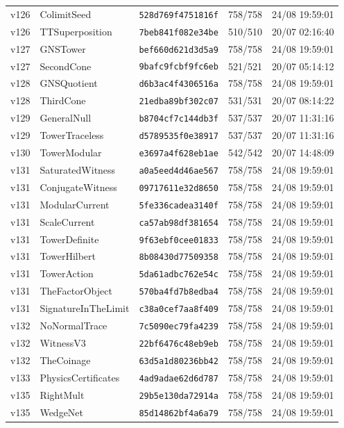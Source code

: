 \documentclass[11pt]{article}
\theoremstyle{definition}\newtheorem{deriv}{Derivation}
\begin{document}
{\begin{longtable}{@{}lllll@{}}
v126 & ColimitSeed & \texttt{528d769f4751816f} & 758/758 & 24/08 19:59:01 \\
v126 & TTSuperposition & \texttt{7beb841f082e34be} & 510/510 & 20/07 02:16:40 \\
v127 & GNSTower & \texttt{bef660d621d3d5a9} & 758/758 & 24/08 19:59:01 \\
v127 & SecondCone & \texttt{9bafc9fcbf9fc6eb} & 521/521 & 20/07 05:14:12 \\
v128 & GNSQuotient & \texttt{d6b3ac4f4306516a} & 758/758 & 24/08 19:59:01 \\
v128 & ThirdCone & \texttt{21edba89bf302c07} & 531/531 & 20/07 08:14:22 \\
v129 & GeneralNull & \texttt{b8704cf7c144db3f} & 537/537 & 20/07 11:31:16 \\
v129 & TowerTraceless & \texttt{d5789535f0e38917} & 537/537 & 20/07 11:31:16 \\
v130 & TowerModular & \texttt{e3697a4f628eb1ae} & 542/542 & 20/07 14:48:09 \\
v131 & SaturatedWitness & \texttt{a0a5eed4d46ae567} & 758/758 & 24/08 19:59:01 \\
v131 & ConjugateWitness & \texttt{09717611e32d8650} & 758/758 & 24/08 19:59:01 \\
v131 & ModularCurrent & \texttt{5fe336cadea3140f} & 758/758 & 24/08 19:59:01 \\
v131 & ScaleCurrent & \texttt{ca57ab98df381654} & 758/758 & 24/08 19:59:01 \\
v131 & TowerDefinite & \texttt{9f63ebf0cee01833} & 758/758 & 24/08 19:59:01 \\
v131 & TowerHilbert & \texttt{8b08430d77509358} & 758/758 & 24/08 19:59:01 \\
v131 & TowerAction & \texttt{5da61adbc762e54c} & 758/758 & 24/08 19:59:01 \\
v131 & TheFactorObject & \texttt{570ba4fd7b8edba4} & 758/758 & 24/08 19:59:01 \\
v131 & SignatureInTheLimit & \texttt{c38a0cef7aa8f409} & 758/758 & 24/08 19:59:01 \\
v132 & NoNormalTrace & \texttt{7c5090ec79fa4239} & 758/758 & 24/08 19:59:01 \\
v132 & WitnessV3 & \texttt{22bf6476c48eb9eb} & 758/758 & 24/08 19:59:01 \\
v132 & TheCoinage & \texttt{63d5a1d80236bb42} & 758/758 & 24/08 19:59:01 \\
v133 & PhysicsCertificates & \texttt{4ad9adae62d6d787} & 758/758 & 24/08 19:59:01 \\
v135 & RightMult & \texttt{29b5e130da72914a} & 758/758 & 24/08 19:59:01 \\
v135 & WedgeNet & \texttt{85d14862bf4a6a79} & 758/758 & 24/08 19:59:01 \\
\bottomrule\end{longtable}}
\end{document}
